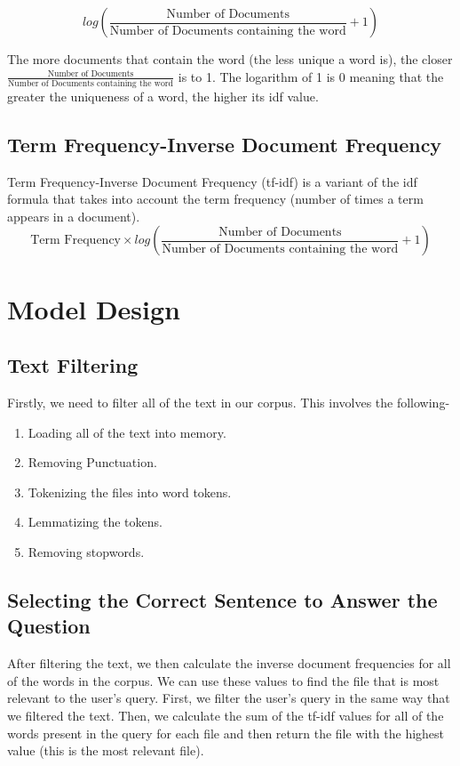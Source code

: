 \documentclass{article}
\begin{document}
\begin{center}
\begin{equation}
    log \left(\frac{\text{Number of Documents}}{\text{Number of Documents containing the word}} + 1\right)
\end{equation} 

\end{center}

The more documents that contain the word (the less unique a word is), the closer $\frac{\text{Number of Documents}}{\text{Number of Documents containing the word}}$ is to 1. The logarithm of 1 is 0 meaning that the greater the uniqueness of a word, the higher its idf value.

\subsection{Term Frequency-Inverse Document Frequency}
Term Frequency-Inverse Document Frequency (tf-idf) is a variant of the idf formula that takes into account the term frequency (number of times a term appears in a document).
\begin{equation}
    \text{Term Frequency} \times log \left(\frac{\text{Number of Documents}}{\text{Number of Documents containing the word}} + 1\right)
\end{equation}

\section{Model Design}
\subsection{Text Filtering}
    Firstly, we need to filter all of the text in our corpus. This involves the following-
    \begin{enumerate}
        \item Loading all of the text into memory.
        \item Removing Punctuation.
        \item Tokenizing the files into word tokens.
        \item Lemmatizing the tokens.
        \item Removing stopwords.
    \end{enumerate}
\subsection{Selecting the Correct Sentence to Answer the Question}
After filtering the text, we then calculate the inverse document frequencies for all of the words in the corpus. We can use these values to find the file that is most relevant to the user's query. First, we filter the user's query in the same way that we filtered the text. Then, we calculate the sum of the tf-idf values for all of the words present in the query for each file and then return the file with the highest value (this is the most relevant file).
\end{document}
